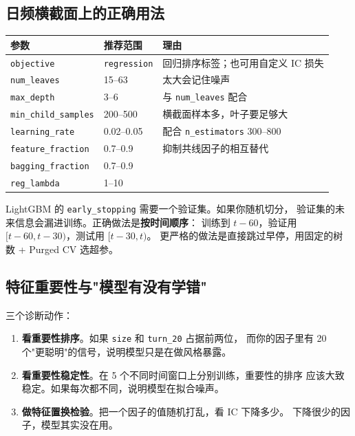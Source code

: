 \subsection{日频横截面上的正确用法}

\begin{center}
\begin{tabular}{@{}lll@{}}
\toprule
参数 & 推荐范围 & 理由 \\
\midrule
\texttt{objective} & \texttt{regression} & 回归排序标签；也可用自定义 IC 损失 \\
\texttt{num\_leaves} & 15--63 & 太大会记住噪声 \\
\texttt{max\_depth} & 3--6 & 与 \texttt{num\_leaves} 配合 \\
\texttt{min\_child\_samples} & 200--500 & 横截面样本多，叶子要足够大 \\
\texttt{learning\_rate} & 0.02--0.05 & 配合 \texttt{n\_estimators} 300--800 \\
\texttt{feature\_fraction} & 0.7--0.9 & 抑制共线因子的相互替代 \\
\texttt{bagging\_fraction} & 0.7--0.9 & \\
\texttt{reg\_lambda} & 1--10 & \\
\bottomrule
\end{tabular}
\end{center}

\begin{warnbox}
LightGBM 的 \texttt{early\_stopping} 需要一个验证集。如果你随机切分，
验证集的未来信息会漏进训练。正确做法是\textbf{按时间顺序}：
训练到 $t-60$，验证用 $[t-60, t-30)$，测试用 $[t-30, t)$。
更严格的做法是直接跳过早停，用固定的树数 + Purged CV 选超参。
\end{warnbox}

\subsection{特征重要性与"模型有没有学错"}

三个诊断动作：

\begin{enumerate}
  \item \textbf{看重要性排序}。如果 \texttt{size} 和 \texttt{turn\_20} 占据前两位，
        而你的因子里有 20 个"更聪明"的信号，说明模型只是在做风格暴露。
  \item \textbf{看重要性稳定性}。在 5 个不同时间窗口上分别训练，重要性的排序
        应该大致稳定。如果每次都不同，说明模型在拟合噪声。
  \item \textbf{做特征置换检验}。把一个因子的值随机打乱，看 IC 下降多少。
        下降很少的因子，模型其实没在用。
\end{enumerate}

